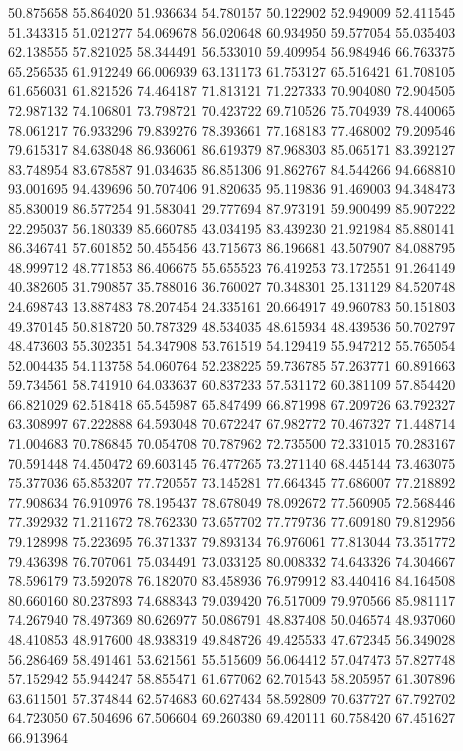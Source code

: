 50.875658
55.864020
51.936634
54.780157
50.122902
52.949009
52.411545
51.343315
51.021277
54.069678
56.020648
60.934950
59.577054
55.035403
62.138555
57.821025
58.344491
56.533010
59.409954
56.984946
66.763375
65.256535
61.912249
66.006939
63.131173
61.753127
65.516421
61.708105
61.656031
61.821526
74.464187
71.813121
71.227333
70.904080
72.904505
72.987132
74.106801
73.798721
70.423722
69.710526
75.704939
78.440065
78.061217
76.933296
79.839276
78.393661
77.168183
77.468002
79.209546
79.615317
84.638048
86.936061
86.619379
87.968303
85.065171
83.392127
83.748954
83.678587
91.034635
86.851306
91.862767
84.544266
94.668810
93.001695
94.439696
50.707406
91.820635
95.119836
91.469003
94.348473
85.830019
86.577254
91.583041
29.777694
87.973191
59.900499
85.907222
22.295037
56.180339
85.660785
43.034195
83.439230
21.921984
85.880141
86.346741
57.601852
50.455456
43.715673
86.196681
43.507907
84.088795
48.999712
48.771853
86.406675
55.655523
76.419253
73.172551
91.264149
40.382605
31.790857
35.788016
36.760027
70.348301
25.131129
84.520748
24.698743
13.887483
78.207454
24.335161
20.664917
49.960783
50.151803
49.370145
50.818720
50.787329
48.534035
48.615934
48.439536
50.702797
48.473603
55.302351
54.347908
53.761519
54.129419
55.947212
55.765054
52.004435
54.113758
54.060764
52.238225
59.736785
57.263771
60.891663
59.734561
58.741910
64.033637
60.837233
57.531172
60.381109
57.854420
66.821029
62.518418
65.545987
65.847499
66.871998
67.209726
63.792327
63.308997
67.222888
64.593048
70.672247
67.982772
70.467327
71.448714
71.004683
70.786845
70.054708
70.787962
72.735500
72.331015
70.283167
70.591448
74.450472
69.603145
76.477265
73.271140
68.445144
73.463075
75.377036
65.853207
77.720557
73.145281
77.664345
77.686007
77.218892
77.908634
76.910976
78.195437
78.678049
78.092672
77.560905
72.568446
77.392932
71.211672
78.762330
73.657702
77.779736
77.609180
79.812956
79.128998
75.223695
76.371337
79.893134
76.976061
77.813044
73.351772
79.436398
76.707061
75.034491
73.033125
80.008332
74.643326
74.304667
78.596179
73.592078
76.182070
83.458936
76.979912
83.440416
84.164508
80.660160
80.237893
74.688343
79.039420
76.517009
79.970566
85.981117
74.267940
78.497369
80.626977
50.086791
48.837408
50.046574
48.937060
48.410853
48.917600
48.938319
49.848726
49.425533
47.672345
56.349028
56.286469
58.491461
53.621561
55.515609
56.064412
57.047473
57.827748
57.152942
55.944247
58.855471
61.677062
62.701543
58.205957
61.307896
63.611501
57.374844
62.574683
60.627434
58.592809
70.637727
67.792702
64.723050
67.504696
67.506604
69.260380
69.420111
60.758420
67.451627
66.913964
